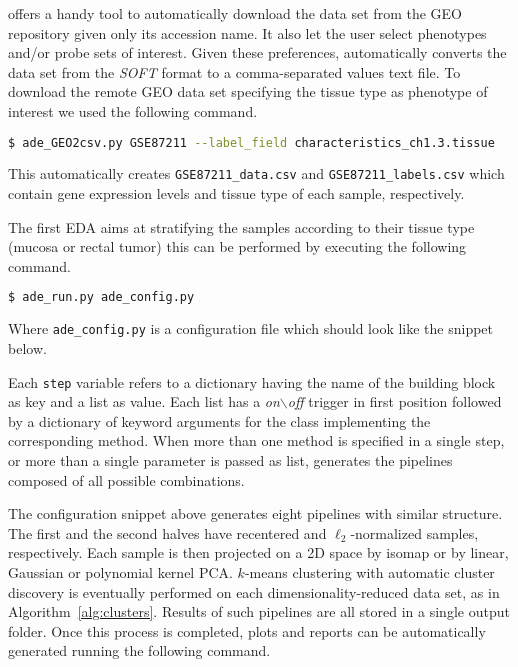 \ade offers a handy tool to automatically download the data set from the GEO repository given only its accession name.
It also let the user select phenotypes and/or probe sets of interest. Given these preferences, \ade automatically converts the data set from the \textit{SOFT} format to a comma-separated values text file. To download the remote GEO data set specifying the tissue type as phenotype of interest we used the following command.

{\footnotesize
\begin{lstlisting}[language=bash,caption={ }]
$ ade_GEO2csv.py GSE87211 --label_field characteristics_ch1.3.tissue
\end{lstlisting}
}

\noindent This automatically creates \texttt{{\footnotesize GSE87211\_data.csv}} and \texttt{{\footnotesize GSE87211\_labels.csv}} which contain gene expression levels and tissue type of each sample, respectively.

The first EDA aims at stratifying the samples according to their tissue type (mucosa or rectal tumor) this can be performed by executing the following command.

{\footnotesize
\begin{lstlisting}[language=bash,caption={ }]
$ ade_run.py ade_config.py
\end{lstlisting}
}

\noindent Where \texttt{{\footnotesize ade\_config.py}} is a configuration file which should look like the snippet below.



\noindent Each \texttt{step} variable refers to a dictionary having the name of the building block as key and a list as value. Each list has a \emph{on$\backslash$off} trigger in first position followed by a dictionary of keyword arguments for the class implementing the corresponding method. When more than one method is specified in a single step, or more than a single parameter is passed as {list}, \ade generates the pipelines composed of all possible combinations.

The configuration snippet above generates eight pipelines with similar structure. The first and the second halves have recentered and $\ell_2$-normalized samples, respectively. Each sample is then projected on a 2D space by isomap or by linear, Gaussian or polynomial kernel PCA. $k$-means clustering with automatic cluster discovery is eventually performed on each dimensionality-reduced data set, as in Algorithm~\ref{alg:clusters}.
Results of such pipelines are all stored in a single output folder. Once this process is completed, plots and reports can be automatically generated running the following command.

